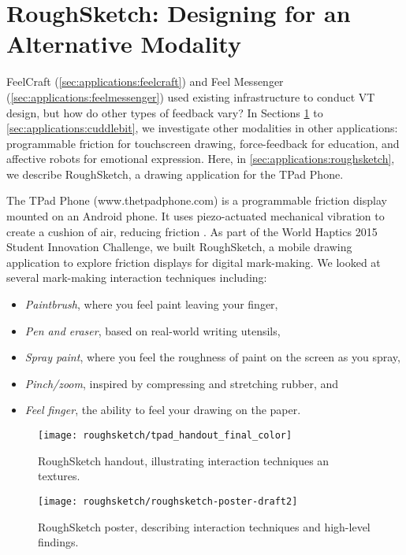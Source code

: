 \section{RoughSketch: Designing for an Alternative Modality}
\label{sec:applications:roughsketch}

FeelCraft (\autoref{sec:applications:feelcraft}) and Feel Messenger (\autoref{sec:applications:feelmessenger}) used existing infrastructure to conduct VT design, but how do other types of feedback vary?
In Sections \ref{sec:applications:roughsketch} to \ref{sec:applications:cuddlebit}, we investigate other modalities in other applications: programmable friction for touchscreen drawing, force-feedback for education, and affective robots for emotional expression.
Here, in \autoref{sec:applications:roughsketch}, we describe RoughSketch, a drawing application for the TPad Phone.

The TPad Phone (www.thetpadphone.com) is a programmable friction display mounted on an Android phone.
It uses piezo-actuated mechanical vibration to create a cushion of air, reducing friction \cite{Winfield2007}.
As part of the World Haptics 2015 Student Innovation Challenge, we built RoughSketch, a mobile drawing application to explore friction displays for digital mark-making.
We looked at several mark-making interaction techniques including:
\begin{itemize}
    \item \textit{Paintbrush}, where you feel paint leaving your finger,
    \item \textit{Pen and eraser}, based on real-world writing utensils,
    \item \textit{Spray paint}, where you feel the roughness of paint on the screen as you spray,
    \item \textit{Pinch/zoom}, inspired by compressing and stretching rubber, and
    \item \textit{Feel finger}, the ability to feel your drawing on the paper.
\end{itemize}

\begin{figure}[htbp] %
   \centering
   \texttt{[image: roughsketch/tpad\_handout\_final\_color]} 
   \caption{RoughSketch handout, illustrating interaction techniques an textures.}
   \label{fig:roughsketch:handout}
\end{figure}

\begin{figure}[htbp] %
   \centering
   \texttt{[image: roughsketch/roughsketch-poster-draft2]} 
   \caption{RoughSketch poster, describing interaction techniques and high-level findings.}
   \label{fig:roughsketch:poster}
\end{figure}

